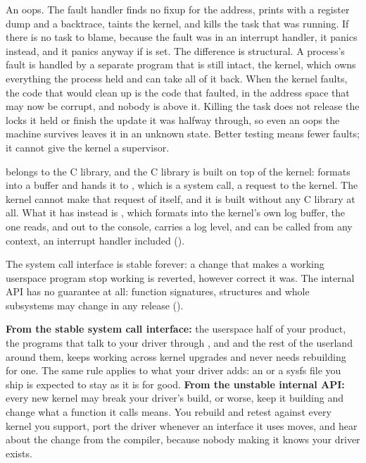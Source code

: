  An oops. The fault handler finds no fixup for the address, prints  with a register dump and a
backtrace, taints the kernel, and kills the task that was running. If there is no task to blame,
because the fault was in an interrupt handler, it panics instead, and it panics anyway if
 is set. The difference is structural. A process's fault is handled by a
separate program that is still intact, the kernel, which owns everything the process held and can
take all of it back. When the kernel faults, the code that would clean up is the code that faulted,
in the address space that may now be corrupt, and nobody is above it. Killing the task does not
release the locks it held or finish the update it was halfway through, so even an oops the machine
survives leaves it in an unknown state. Better testing means fewer faults; it cannot give the kernel
a supervisor.

  belongs to the C library, and the C library is built on top of the kernel:
 formats into a buffer and hands it to , which is a system call, a request
to the kernel. The kernel cannot make that request of itself, and it is built without any C library
at all. What it has instead is , which formats into the kernel's own log buffer, the
one  reads, and out to the console, carries a log level, and can be called from any
context, an interrupt handler included ().


 The system call interface is stable forever: a change that makes a working userspace
program stop working is reverted, however correct it was. The internal API has no guarantee at all:
function signatures, structures and whole subsystems may change in any release
().

 \textbf{From the stable system call interface:} the userspace half of your product, the
programs that talk to your driver through ,  and  and the rest of
the userland around them, keeps working across kernel upgrades and never needs rebuilding for one.
The same rule applies to what your driver adds: an  or a sysfs file you ship is expected
to stay as it is for good. \textbf{From the unstable internal API:} every new kernel may break your
driver's build, or worse, keep it building and change what a function it calls means. You rebuild
and retest against every kernel you support, port the driver whenever an interface it uses moves,
and hear about the change from the compiler, because nobody making it knows your driver exists.

